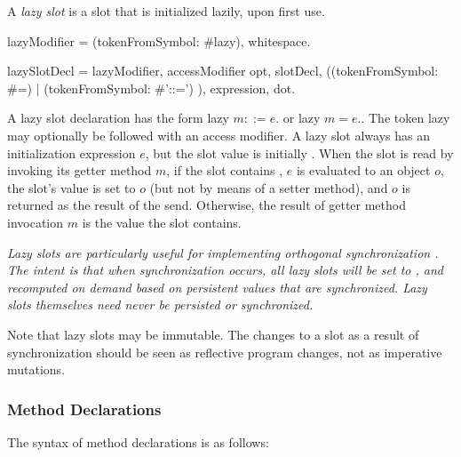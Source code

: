 \documentclass{article}
\newcommand{\code}[1]{{\sf #1}}
\begin{document}
A {\em lazy slot} is a  slot that is initialized lazily, upon first use. 

\begin{newspeak}
lazyModifier = (tokenFromSymbol: \#lazy), whitespace.

lazySlotDecl = lazyModifier, accessModifier opt, slotDecl, 
                    ((tokenFromSymbol: \#=) $|$ 
                      (tokenFromSymbol: \#'::=')
                     ), expression, dot.
\end{newspeak}

A lazy slot declaration has the form \code{lazy $m ::= e.$} or \code{lazy $m = e.$}. The token \code{lazy} may optionally be followed with an access modifier.
 A lazy slot  always has an initialization expression $e$, but the slot value is initially \NIL{}.
When the slot is read by invoking its getter method $m$, if the slot contains \NIL{}, $e$ is evaluated to an object $o$, the slot's value is set to $o$ (but not by means of a setter method), and $o$ is returned as the result of the send.  Otherwise, the result of getter method invocation $m$ is the value the slot contains.  


{\it 
Lazy slots are particularly useful for implementing {\em orthogonal synchronization} \cite{bracha05}. The intent is that when synchronization occurs, all lazy slots will be set to \NIL{}, and recomputed on demand based on persistent values that are synchronized. Lazy slots themselves need never be persisted or synchronized.

Note that lazy slots may be immutable. The changes to a slot as a result of synchronization should be seen as reflective program changes, not as imperative mutations.
}

\subsubsection{Method Declarations}
\label{methodDecls}

The syntax of method declarations is as follows:
\end{document}
